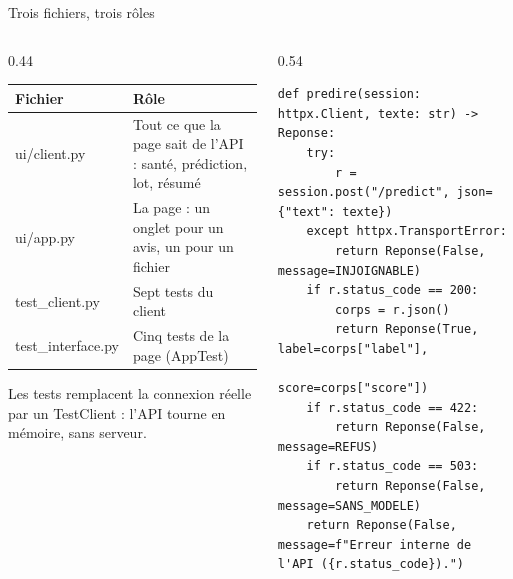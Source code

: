 \documentclass[aspectratio=169,11pt]{beamer}
\newcommand{\co}[1]{{\ttfamily\hyphenchar\font=45\relax #1}}
\begin{document}
\begin{frame}[fragile]{Trois fichiers, trois rôles}
\begin{columns}[T]
\begin{column}{0.44\textwidth}
\scriptsize
\begin{tabularx}{\textwidth}{@{}l X@{}}
\toprule
\textbf{Fichier} & \textbf{Rôle} \\
\midrule
\co{ui/client.py} & Tout ce que la page sait de l'API : santé, prédiction, lot, résumé \\
\co{ui/app.py} & La page : un onglet pour un avis, un pour un fichier \\
\co{test\_client.py} & Sept tests du client \\
\co{test\_interface.py} & Cinq tests de la page (\co{AppTest}) \\
\bottomrule
\end{tabularx}

\medskip
Les tests remplacent la connexion réelle par un \co{TestClient} : l'API tourne en mémoire, sans serveur.
\end{column}
\begin{column}{0.54\textwidth}
\begin{lstlisting}[basicstyle=\ttfamily\tiny]
def predire(session: httpx.Client, texte: str) -> Reponse:
    try:
        r = session.post("/predict", json={"text": texte})
    except httpx.TransportError:
        return Reponse(False, message=INJOIGNABLE)
    if r.status_code == 200:
        corps = r.json()
        return Reponse(True, label=corps["label"],
                       score=corps["score"])
    if r.status_code == 422:
        return Reponse(False, message=REFUS)
    if r.status_code == 503:
        return Reponse(False, message=SANS_MODELE)
    return Reponse(False, message=f"Erreur interne de l'API ({r.status_code}).")
\end{lstlisting}
\end{column}
\end{columns}
\end{frame}
\end{document}
